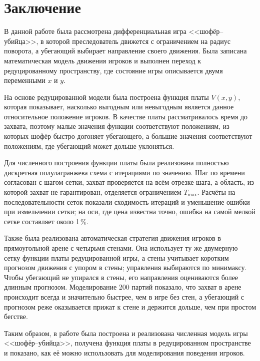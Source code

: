 \documentclass[14pt,a4paper]{extarticle}
\begin{document}
	\section{Заключение}
	
	В данной работе была рассмотрена дифференциальная игра
	<<шофёр--убийца>>, в которой преследователь движется с ограничением на
	радиус поворота, а убегающий выбирает направление своего движения. Была
	записана математическая модель движения игроков и выполнен переход к
	редуцированному пространству, где состояние игры описывается двумя
	переменными $x$ и $y$.
	
	На основе редуцированной модели была построена функция платы $V(x,y)$,
	которая показывает, насколько выгодным или невыгодным является данное
	относительное положение игроков. В качестве платы рассматривалось время
	до захвата, поэтому малые значения функции соответствуют положениям, из
	которых шофёр быстро догоняет убегающего, а большие значения соответствуют
	положениям, где убегающий может дольше уклоняться.
	
	Для численного построения функции платы была реализована полностью дискретная полулагранжева схема с итерациями по значению. Шаг по времени согласован с шагом сетки, захват проверяется на всём отрезке шага, а область, из которой захват не гарантирован, отделяется ограничением $T_{\max}$. Расчёты на последовательности сеток показали сходимость итераций и уменьшение ошибки при измельчении сетки; на оси, где цена известна точно, ошибка на самой мелкой сетке составляет около 1\,\%.

	Также была реализована автоматическая стратегия движения игроков в прямоугольной арене с четырьмя стенами. Она использует ту же двумерную сетку функции платы редуцированной игры, а стены учитывает коротким прогнозом движения с упором в стены; управления выбираются по минимаксу. Чтобы убегающий не упирался в стены, его направления оцениваются более длинным прогнозом. Моделирование 200 партий показало, что захват в арене происходит всегда и значительно быстрее, чем в игре без стен, а убегающий с прогнозом реже оказывается прижат к стене и держится дольше, чем при простом бегстве.

	Таким образом, в работе была построена и реализована численная модель
	игры <<шофёр--убийца>>, получена функция платы в редуцированном
	пространстве и показано, как её можно использовать для моделирования
	поведения игроков.
	
\end{document}
